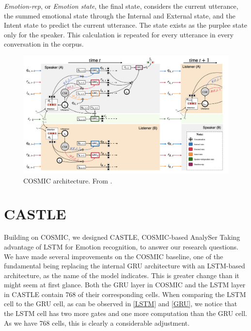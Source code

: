 \documentclass[nofilelist]{cslthse-msc}
\begin{document}
\emph{Emotion-rep}, or \emph{Emotion state}, the final state, considers the current utterance, the summed emotional state through the Internal and External state, and the Intent state to predict the current utterance. The state exists as the purplee state only for the speaker. This calculation is repeated for every utterance in every conversation in the corpus.



\begin{figure}[!ht]
    \centering
    \includegraphics[scale=0.3]{msccls/explanatory_images/COSMIC_arch.png}
    \caption{COSMIC architecture. From \citet{ghosal2020cosmic}.}
    \label{fig:COSMIC_arch}
\end{figure}


\section{CASTLE}
Building on COSMIC, we designed CASTLE, COSMIC-based AnalySer Taking advantage of LSTM for Emotion recognition, to answer our research questions. We have made several improvements on the COSMIC baseline, one of the fundamental being replacing the internal GRU architecture with an LSTM-based architecture, as the name of the model indicates. This is greater change than it might seem at first glance. Both the GRU layer in COSMIC and the LSTM layer in CASTLE contain 768 of their corresponding cells. When comparing the LSTM cell to the GRU cell, as can be observed in \ref{LSTM} and \ref{GRU}, we notice that the LSTM cell has two more gates and one more computation than the GRU cell. As we have 768 cells, this is clearly a considerable adjustment. 
\end{document}
